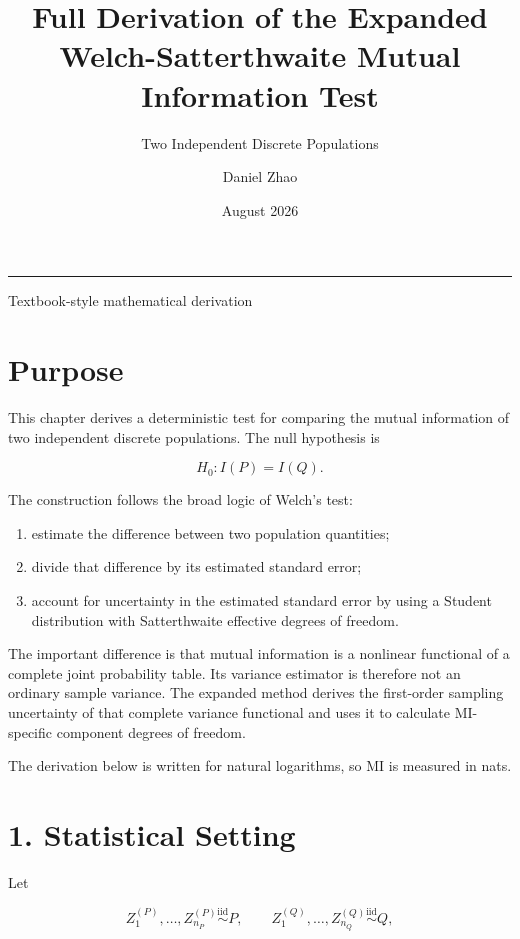 \documentclass[
  11pt]{article}
\title{Full Derivation of the Expanded Welch-Satterthwaite Mutual
Information Test}
\subtitle{Two Independent Discrete Populations}
\author{Daniel Zhao}
\date{August 2026}
\makeatletter
\providecommand{\tightlist}{%
  \setlength{\itemsep}{0pt}\setlength{\parskip}{0pt}}
\let\originalsection\section
\renewcommand{\section}{\clearpage\originalsection}
\renewcommand{\maketitle}{%
  \hypersetup{pageanchor=false}
  \begin{titlepage}
  \centering
  \vspace*{0.17\textheight}
  {\color{MethodBlue}\Huge\bfseries\@title\par}
  \vspace{2.5em}
  {\Large\normalfont\@author\par}
  \vspace{1.25em}
  {\large\normalfont\@date\par}
  \vfill
  \rule{0.72\textwidth}{0.6pt}
  \par\vspace{1em}
  \large Textbook-style mathematical derivation
  \end{titlepage}
  \hypersetup{pageanchor=true}
}
\makeatother
\begin{document}
\maketitle

{
\setcounter{tocdepth}{2}
\tableofcontents
}
\section{Purpose}\label{purpose}

This chapter derives a deterministic test for comparing the mutual
information of two independent discrete populations. The null hypothesis
is

\begin{equation}
H_0:I(P)=I(Q).
\end{equation}

The construction follows the broad logic of Welch's test:

\begin{enumerate}
\def\labelenumi{\arabic{enumi}.}
\tightlist
\item
  estimate the difference between two population quantities;
\item
  divide that difference by its estimated standard error;
\item
  account for uncertainty in the estimated standard error by using a
  Student distribution with Satterthwaite effective degrees of freedom.
\end{enumerate}

The important difference is that mutual information is a nonlinear
functional of a complete joint probability table. Its variance estimator
is therefore not an ordinary sample variance. The expanded method
derives the first-order sampling uncertainty of that complete variance
functional and uses it to calculate MI-specific component degrees of
freedom.

The derivation below is written for natural logarithms, so MI is
measured in nats.

\section{1. Statistical Setting}\label{statistical-setting}

Let

\begin{equation}
Z_1^{(P)},\ldots,Z_{n_P}^{(P)}\overset{\mathrm{iid}}{\sim}P,
\qquad
Z_1^{(Q)},\ldots,Z_{n_Q}^{(Q)}\overset{\mathrm{iid}}{\sim}Q,
\end{equation}
\end{document}

